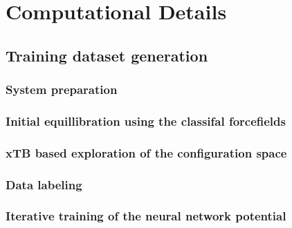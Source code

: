 \chapter{Computational Details}

\section{Training dataset generation}

\subsection{System preparation}

\subsection{Initial equillibration using the classifal forcefields}

\subsection{xTB based exploration of the configuration space}

\subsection{Data labeling}

\subsection{Iterative training of the neural network potential}

